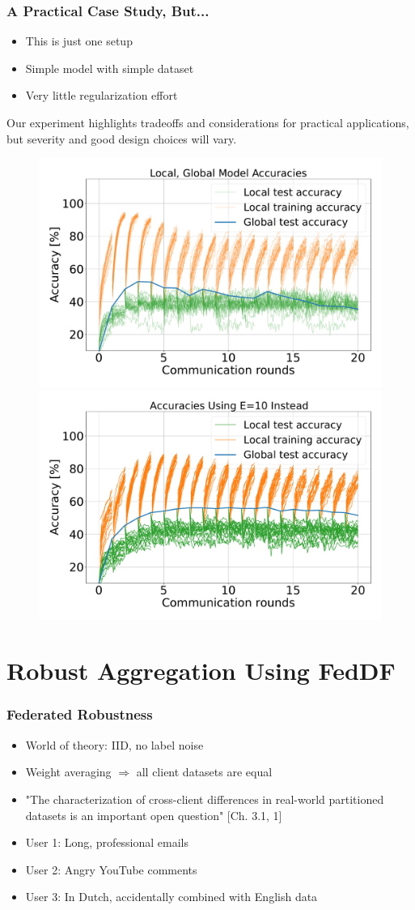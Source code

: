 \documentclass{beamer}
\begin{document}
\begin{frame}
\frametitle{A Practical Case Study, But...}
    \small
    \begin{itemize}
        \item This is just one setup
        \item Simple model with simple dataset
        \item Very little regularization effort
    \end{itemize}
    Our experiment highlights tradeoffs and considerations for practical applications, but severity and good design choices will vary.
    \begin{figure}[H]
        \centering
        \includegraphics[width=.49\linewidth]{imgs/accuracy.pdf}
        \includegraphics[width=.49\linewidth]{imgs/accuracyE10.pdf}
    \end{figure}\noindent
\end{frame}

\section{Robust Aggregation Using FedDF}
\begin{frame}
    \frametitle{Federated Robustness}
    \begin{itemize}
        \item World of theory: IID, no label noise
        \item Weight averaging $\Rightarrow$ all client datasets are equal
        \item "The characterization of cross-client differences in real-world partitioned datasets is an important open question" [Ch. 3.1, 1]
    \end{itemize}

    \begin{example}
        \begin{itemize}
            \item User 1: Long, professional emails
            \item User 2: Angry YouTube comments
            \item User 3: In Dutch, accidentally combined with English data
        \end{itemize}
    \end{example}
\end{frame}
\end{document}
